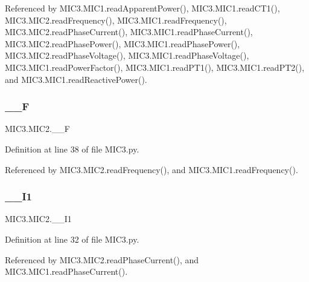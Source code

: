 Referenced by M\+I\+C3.\+M\+I\+C1.\+read\+Apparent\+Power(), M\+I\+C3.\+M\+I\+C1.\+read\+C\+T1(), M\+I\+C3.\+M\+I\+C2.\+read\+Frequency(), M\+I\+C3.\+M\+I\+C1.\+read\+Frequency(), M\+I\+C3.\+M\+I\+C2.\+read\+Phase\+Current(), M\+I\+C3.\+M\+I\+C1.\+read\+Phase\+Current(), M\+I\+C3.\+M\+I\+C2.\+read\+Phase\+Power(), M\+I\+C3.\+M\+I\+C1.\+read\+Phase\+Power(), M\+I\+C3.\+M\+I\+C2.\+read\+Phase\+Voltage(), M\+I\+C3.\+M\+I\+C1.\+read\+Phase\+Voltage(), M\+I\+C3.\+M\+I\+C1.\+read\+Power\+Factor(), M\+I\+C3.\+M\+I\+C1.\+read\+P\+T1(), M\+I\+C3.\+M\+I\+C1.\+read\+P\+T2(), and M\+I\+C3.\+M\+I\+C1.\+read\+Reactive\+Power().

\mbox{\label{class_m_i_c3_1_1_m_i_c2_af4f02067aa2b0631aa7fbe60406a86cf}} 
\subsubsection{\texorpdfstring{\+\_\+\+\_\+F}{\_\_F}}
{\footnotesize\ttfamily M\+I\+C3.\+M\+I\+C2.\+\_\+\+\_\+F\hspace{0.3cm}{\ttfamily [private]}}



Definition at line 38 of file M\+I\+C3.\+py.



Referenced by M\+I\+C3.\+M\+I\+C2.\+read\+Frequency(), and M\+I\+C3.\+M\+I\+C1.\+read\+Frequency().

\mbox{\label{class_m_i_c3_1_1_m_i_c2_a74b954717f248d73546151a9166a5be0}} 
\subsubsection{\texorpdfstring{\+\_\+\+\_\+\+I1}{\_\_I1}}
{\footnotesize\ttfamily M\+I\+C3.\+M\+I\+C2.\+\_\+\+\_\+\+I1\hspace{0.3cm}{\ttfamily [private]}}



Definition at line 32 of file M\+I\+C3.\+py.



Referenced by M\+I\+C3.\+M\+I\+C2.\+read\+Phase\+Current(), and M\+I\+C3.\+M\+I\+C1.\+read\+Phase\+Current().


